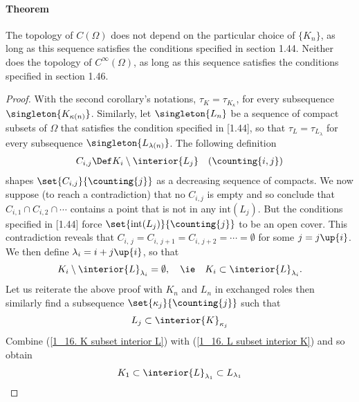 \paragraph{Theorem} 
The topology of $C(\Omega)$ does not depend on the particular choice of 
$\{K_{n}\}$, as long as this sequence satisfies the conditions 
specified in section 1.44. Neither does the topology of $C^\infty (\Omega)$, 
as long as this sequence satisfies the conditions specified in section 1.46.
%
\begin{proof}%
With the second corollary's notations,
% 
  $\tau_{K} = \tau_{K_\kappa}$,
%
for every subsequence $\singleton{K_{\kappa(n)}}$.
% 
Similarly, let 
%
  $\singleton{L_n}$ 
% 
be a sequence of compact subsets of $\Omega$ that satisfies 
the condition specified in [1.44], 
so that 
%
  $\tau_{L} = \tau_{L_\lambda}$
%
for every subsequence $\singleton{L_{\lambda(n)}}$. 
%
The following definition
%
  \begin{align}
    C_{i, j} \Def K_i \setminus \interior{L_j} \quad (\counting{i, j})
  \end{align}
%
shapes $\set{C_{i, j}}{\counting{j}}$ as a decreasing sequence of compacts.
%
We now suppose (to reach a contradiction) that 
% 
  no $C_{i, j}$ is empty 
% 
and so conclude that 
% 
  $C_{i, 1} \cap C_{i, 2} \cap \cdots$
%
contains a point that is not in any $\text{int}(L_j)$. 
But the conditions specified in [1.44] force 
% 
  $\set{\text{int}(L_j)}{\counting{j}}$ 
%
to be an open cover.
% 
This contradiction reveals that 
%
  $C_{i,\,j} = C_{i, \,j+1} = C_{i, \,j+2} = \cdots =\emptyset$
%  
for some $j=j\up{i}$. We then define  
%
  $\lambda_i = i + j\up{i}$, 
% 
so that
%
  \begin{align}
    \label{1_16. K subset interior L}
    K_i \setminus \interior{L}_{\lambda_i} = \emptyset, \quad \ie \quad
    K_i 
      \subset 
    \interior{L}_{\lambda_i}.
  \end{align} 
%
Let us reiterate the above proof with $K_n$ and $L_n$ in exchanged roles 
then similarly find a subsequence $\set{\kappa_j}{\counting{j}}$ such that 
%
  \begin{align}
  \label{1_16. L subset interior K}
    L_j \subset \interior{K}_{\kappa_j}
  \end{align}
%
Combine 
%
  (\ref{1_16. K subset interior L}) with 
  (\ref{1_16. L subset interior K}) 
%
and so obtain
%
  \begin{align}
    K_1 
      \subset 
    \interior{L}_{\lambda_1} 
      \subset 
    L_{\lambda_1} 

\end{align}
\end{proof}
